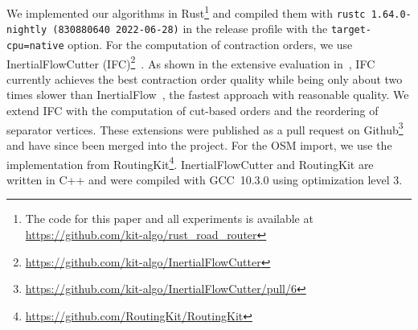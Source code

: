 \documentclass[a4paper, english, cleveref]{lipics-v2021}
\begin{document}
We implemented our algorithms in Rust\footnote{
The code for this paper and all experiments is available at \url{https://github.com/kit-algo/rust_road_router} %
} and compiled them with \texttt{rustc 1.64.0-nightly (830880640 2022-06-28)} in the release profile with the \texttt{target-cpu=native} option.
For the computation of contraction orders, we use InertialFlowCutter (IFC)\footnote{\url{https://github.com/kit-algo/InertialFlowCutter}}~\cite{GottesburenHUW19}.
As shown in the extensive evaluation in~\cite{GottesburenHUW19}, IFC currently achieves the best contraction order quality while being only about two times slower than InertialFlow~\cite{SchildS15}, the fastest approach with reasonable quality.
We extend IFC with the computation of cut-based orders and the reordering of separator vertices.
These extensions were published as a pull request on Github\footnote{\url{https://github.com/kit-algo/InertialFlowCutter/pull/6}} and have since been merged into the project.
For the OSM import, we use the implementation from RoutingKit\footnote{\url{https://github.com/RoutingKit/RoutingKit}}.
InertialFlowCutter and RoutingKit are written in C++ and were compiled with GCC~10.3.0 using optimization level 3.
\end{document}
